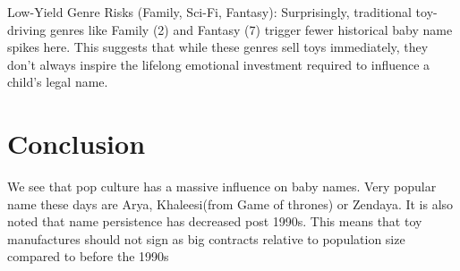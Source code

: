 \documentclass[
]{article}
\begin{document}
Low-Yield Genre Risks (Family, Sci-Fi, Fantasy): Surprisingly,
traditional toy-driving genres like Family (2) and Fantasy (7) trigger
fewer historical baby name spikes here. This suggests that while these
genres sell toys immediately, they don't always inspire the lifelong
emotional investment required to influence a child's legal name.

\section{Conclusion}\label{conclusion}

We see that pop culture has a massive influence on baby names. Very
popular name these days are Arya, Khaleesi(from Game of thrones) or
Zendaya. It is also noted that name persistence has decreased post
1990s. This means that toy manufactures should not sign as big contracts
relative to population size compared to before the 1990s
\end{document}
